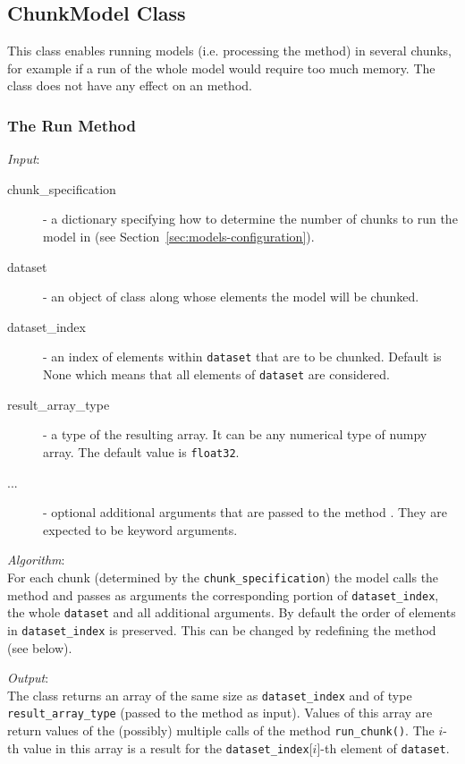 {\subsection{ChunkModel Class}
\label{sec:chunk-model} 

This class enables running models (i.e. processing the  method) in
several chunks, for example if a run of the whole model would require too much
memory. The class does not have any effect on an  method.

\subsubsection{The Run Method}
{\it Input}:
\begin{description}
\item[chunk_specification] - a dictionary specifying how to determine the number
  of chunks to run the model in (see Section~\ref{sec:models-configuration}).
\item[dataset] - an object of class  along whose elements the
  model will be chunked.
\item[dataset_index] - an index of elements within \verb|dataset| that are to
  be chunked. Default is None which means that all elements of \verb|dataset| are considered.
\item[result_array_type] - a type of the resulting array. It can be any numerical type of numpy array. \numpyindex
        The default value is \verb|float32|.
\item[...] - optional additional arguments that are passed to the method
  . They are expected to be keyword arguments.
\end{description}


{\it Algorithm}:~\\[1mm]
%
For each chunk (determined by the \verb|chunk_specification|) the model calls
the method  and passes as arguments the corresponding portion
of \verb|dataset_index|, \datasetindex the whole \verb|dataset| \datasetindex and all additional
arguments. By default the order of elements in \verb|dataset_index| is
preserved. This can be changed by redefining the method
 (see below). 

{\it Output}:~\\[1mm]
%
The class returns an array of the same size as \verb|dataset_index| and of type \verb|result_array_type| 
(passed to the method as input).
Values of this array are return values of the (possibly) multiple calls of the method \verb|run_chunk()|.
The $i$-th value in this array is a result for the \verb|dataset_index|[$i$]-th element of \verb|dataset|.

}
